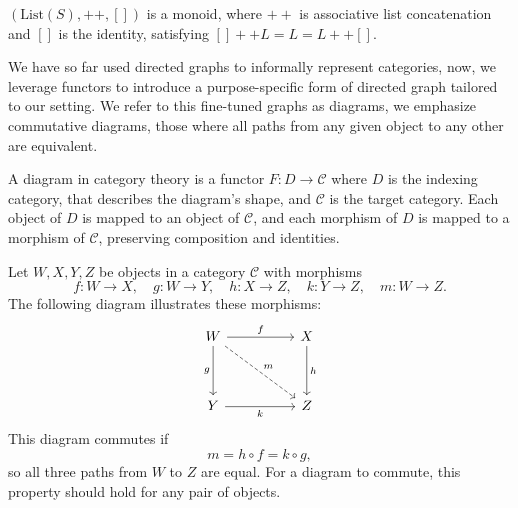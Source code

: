 \begin{note} \( (\mathrm{List}(S), ++, []) \) is a monoid, where $++$ is associative list concatenation and $[]$ is the identity, satisfying $ [] ++ L = L = L ++ []$.
\end{note}

We have so far used directed graphs to informally represent categories, now, we leverage functors to introduce a purpose-specific form of directed graph tailored to our setting. We refer to this fine-tuned graphs as diagrams, we emphasize commutative diagrams, those where all paths from any given object to any other are equivalent.

\begin{definition} A diagram in category theory is a functor
  \(
    F : D \to \mathcal{C}
  \)
  where \(D\) is the indexing category, that describes the diagram's shape, and \(\mathcal{C}\) is the target category. Each object of \(D\) is mapped to an object of \(\mathcal{C}\), and each morphism of \(D\) is mapped to a morphism of \(\mathcal{C}\), preserving composition and identities.

\end{definition}

\begin{example} Let $W, X, Y, Z$ be objects in a category $\mathcal{C}$ with morphisms
  \[
    f: W \to X, \quad g: W \to Y, \quad h: X \to Z, \quad k: Y \to Z, \quad m: W \to Z.
  \]
  The following diagram illustrates these morphisms:
  \[
    \begin{tikzcd}[row sep=huge, column sep=huge]
      W \arrow[r, "f"] \arrow[d, "g"'] \arrow[dr, "m", dashed] & X \arrow[d, "h"] \\
      Y \arrow[r, "k"'] & Z
    \end{tikzcd}
  \]
  This diagram commutes if 
  \[
    m = h \circ f = k \circ g,
\]
so all three paths from $W$ to $Z$ are equal. For a diagram to commute, this property should hold for any pair of objects.
\end{example}

